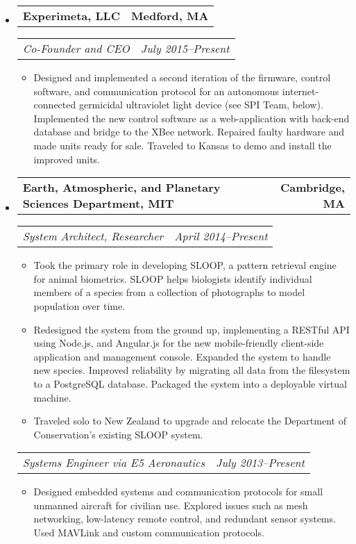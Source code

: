 \documentclass[10pt,letterpaper]{article}
\newcommand{\headerrow}[2]{%
    \begin{tabularx}{\linewidth}{Xr}
	    #1 & #2 \\
    \end{tabularx}
}
\begin{document}
\begin{itemize}
    \item
    \headerrow{\textbf{Experimeta, LLC}}{\textbf{Medford, MA}}
    \headerrow{\textit{Co-Founder and CEO}}{\textit{July 2015--Present}}
    \begin{itemize}
        \item Designed and implemented a second iteration of the firmware,
            control software, and communication protocol for an autonomous
            internet-connected germicidal ultraviolet light device (see SPI
            Team, below).  Implemented the new control software as a
            web-application with back-end database and bridge to the XBee
            network.  Repaired faulty hardware and made units ready for sale.
            Traveled to Kansas to demo and install the improved units.
    \end{itemize}

    \item
    \headerrow{\textbf{Earth, Atmospheric, and Planetary Sciences Department, MIT}}
        {\textbf{Cambridge, MA}}
    \headerrow{\textit{System Architect, Researcher}}{\textit{April 2014--Present}}
    \begin{itemize}
        \item Took the primary role in developing SLOOP, a pattern retrieval
            engine for animal biometrics.  SLOOP helps biologists identify
            individual members of a species from a collection of photographs to
            model population over time.

        \item Redesigned the system from the ground up, implementing a RESTful
            API using Node.js, and Angular.js for the new mobile-friendly
            client-side application and management console. Expanded the system
            to handle new species.  Improved reliability by migrating all data
            from the filesystem to a PostgreSQL database.  Packaged the system
            into a deployable virtual machine.

        \item Traveled solo to New Zealand to upgrade and relocate the
            Department of Conservation's existing SLOOP system.
    \end{itemize}

    \headerrow{\textit{Systems Engineer via E5 Aeronautics}}
        {\textit{July 2013--Present}}
    \begin{itemize}
        \item Designed embedded systems and communication protocols for small
            unmanned aircraft for civilian use.  Explored
            issues such as mesh networking, low-latency remote control, and
            redundant sensor systems.  Used MAVLink and custom communication
            protocols.


\end{itemize}
\end{itemize}
\end{document}
